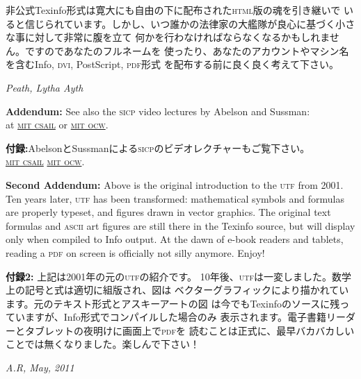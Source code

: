 \documentclass[oneside]{book}
\newcommand{\acronym}[1]{\textsc{\MakeLowercase{#1}}}
\begin{document}
非公式Texinfo形式は寛大にも自由の下に配布された\acronym{HTML}版の魂を引き継いで
いると信じられています。しかし、いつ誰かの法律家の大艦隊が良心に基づく小さな事に対して非常に腹を立て
何かを行わなければならなくなるかもしれません。ですのであなたのフルネームを
使ったり、あなたのアカウントやマシン名を含むInfo, \acronym{DVI}, PostScript, \acronym{PDF}形式
を配布する前に良く良く考えて下さい。

\noindent
\textit{Peath, Lytha Ayth}

\vspace{1.0em}
\noindent
\textbf{Addendum:} See also the \acronym{SICP} video lectures by Abelson and Sussman:\\
at \href{http://groups.csail.mit.edu/mac/classes/6.001/abelson-sussman-lectures/}{\acronym{MIT CSAIL}} or 
\href{http://ocw.mit.edu/courses/electrical-engineering-and-computer-science/6-001-structure-and-interpretation-of-computer-programs-spring-2005/video-lectures/}{\acronym{MIT OCW}}.

\textbf{付録:}AbelsonとSussmanによる\acronym{SICP}のビデオレクチャーもご覧下さい。\\
\href{http://groups.csail.mit.edu/mac/classes/6.001/abelson-sussman-lectures/}{\acronym{MIT CSAIL}}
\href{http://ocw.mit.edu/courses/electrical-engineering-and-computer-science/6-001-structure-and-interpretation-of-computer-programs-spring-2005/video-lectures/}{\acronym{MIT OCW}}.


\vspace{0.5em}
\noindent 
\textbf{Second Addendum:} Above is the original introduction to the \acronym{UTF} 
from 2001. Ten years later, \acronym{UTF} has been transformed: mathematical 
symbols and formulas are properly typeset, and figures drawn in 
vector graphics. The original text formulas and \acronym{ASCII} art figures 
are still there in the Texinfo source, but will display only when compiled 
to Info output. At the dawn of e-book readers and tablets, reading a 
\acronym{PDF} on screen is officially not silly anymore. Enjoy!

\noindent
\textbf{付録2:} 上記は2001年の元の\acronym{UTF}の紹介です。
10年後、\acronym{UTF}は一変しました。数学上の記号と式は適切に組版され、図は
ベクターグラフィックにより描かれています。元のテキスト形式とアスキーアートの図
は今でもTexinfoのソースに残っていますが、Info形式でコンパイルした場合のみ
表示されます。電子書籍リーダーとタブレットの夜明けに画面上で\acronym{PDF}を
読むことは正式に、最早バカバカしいことでは無くなりました。楽しんで下さい！

\vspace{0.5em}
\noindent
\textit{A.R, May, 2011}
\end{document}
